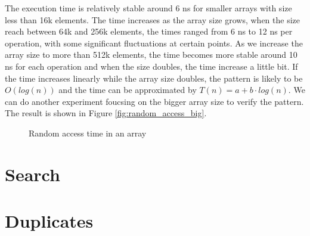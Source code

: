 \documentclass[a4paper,11pt]{article}
\begin{document}
The execution time is relatively stable around 6 ns for smaller arrays with size less 
than 16k elements. The time increases as the array size grows, when the size reach between
64k and 256k elements, the times ranged from 6 ns to 12 ns per operation, with some
significant fluctuations at certain points. As we increase the array size to more than 512k elements,
the time becomes more stable around 10 ns for each operation and when the size doubles, the time
increase a little bit. If the time increases linearly while the array size doubles, the pattern is likely
to be $O(log(n))$ and the time can be approximated by $T(n) = a + b \cdot log(n)$. We can do another
experiment foucsing on the bigger array size to verify the pattern. The result is shown in Figure \ref{fig:random_access_big}.

\begin{figure}[h]
  \centering
  \caption{Random access time in an array}
  \label{fig:random_access}
\end{figure}

\section*{Search}

\section*{Duplicates}
\end{document}
